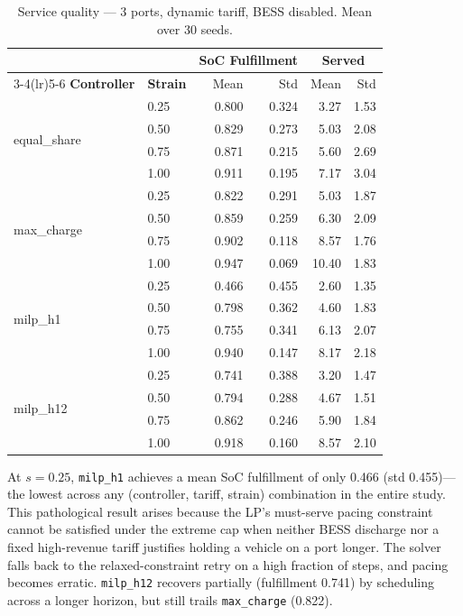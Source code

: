 \begin{table}[!htb]
\centering
\caption{Service quality — 3 ports, dynamic tariff, BESS disabled.
         Mean over 30 seeds.}
\label{tab:gc_dyn_nobess_service}
\setlength{\tabcolsep}{4.5pt}
\begin{tabular}{ll rr rr}
\toprule
 & & \multicolumn{2}{c}{\textbf{SoC Fulfillment}} & \multicolumn{2}{c}{\textbf{Served}} \\
\cmidrule(lr){3-4}\cmidrule(lr){5-6}
\textbf{Controller} & \textbf{Strain} & Mean & Std & Mean & Std \\
\midrule
\multirow{4}{*}{equal\_share}
  & 0.25 & 0.800 & 0.324 &  3.27 & 1.53 \\
  & 0.50 & 0.829 & 0.273 &  5.03 & 2.08 \\
  & 0.75 & 0.871 & 0.215 &  5.60 & 2.69 \\
  & 1.00 & 0.911 & 0.195 &  7.17 & 3.04 \\
\midrule
\multirow{4}{*}{max\_charge}
  & 0.25 & 0.822 & 0.291 &  5.03 & 1.87 \\
  & 0.50 & 0.859 & 0.259 &  6.30 & 2.09 \\
  & 0.75 & 0.902 & 0.118 &  8.57 & 1.76 \\
  & 1.00 & 0.947 & 0.069 & 10.40 & 1.83 \\
\midrule
\multirow{4}{*}{milp\_h1}
  & 0.25 & 0.466 & 0.455 &  2.60 & 1.35 \\
  & 0.50 & 0.798 & 0.362 &  4.60 & 1.83 \\
  & 0.75 & 0.755 & 0.341 &  6.13 & 2.07 \\
  & 1.00 & 0.940 & 0.147 &  8.17 & 2.18 \\
\midrule
\multirow{4}{*}{milp\_h12}
  & 0.25 & 0.741 & 0.388 &  3.20 & 1.47 \\
  & 0.50 & 0.794 & 0.288 &  4.67 & 1.51 \\
  & 0.75 & 0.862 & 0.246 &  5.90 & 1.84 \\
  & 1.00 & 0.918 & 0.160 &  8.57 & 2.10 \\
\bottomrule
\end{tabular}
\end{table}

At $s=0.25$, \texttt{milp\_h1} achieves a mean SoC fulfillment of only 0.466
(std 0.455)—the lowest across any (controller, tariff, strain) combination in
the entire study.  This pathological result arises because the LP's
must-serve pacing constraint cannot be satisfied under the extreme cap when
neither BESS discharge nor a fixed high-revenue tariff justifies holding a
vehicle on a port longer.  The solver falls back to the relaxed-constraint
retry on a high fraction of steps, and pacing becomes erratic.
\texttt{milp\_h12} recovers partially (fulfillment 0.741) by scheduling
across a longer horizon, but still trails \texttt{max\_charge} (0.822).

